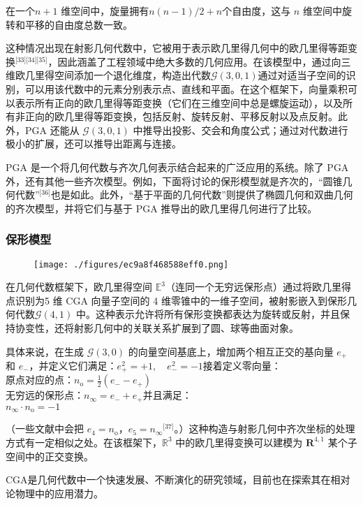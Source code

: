 在一个$n+1$ 维空间中，旋量拥有$n(n-1)/2 + n$个自由度，这与 $n$ 维空间中旋转和平移的自由度总数一致。

这种情况出现在射影几何代数中，它被用于表示欧几里得几何中的欧几里得等距变换\(^\text{[33][34][35]}\)，因此涵盖了工程领域中绝大多数的几何应用。在该模型中，通过向三维欧几里得空间添加一个退化维度，构造出代数$\mathcal{G}(3,0,1)$通过对适当子空间的识别，可以用该代数中的元素分别表示点、直线和平面。在这个框架下，向量乘积可以表示所有正向的欧几里得等距变换（它们在三维空间中总是螺旋运动），以及所有非正向的欧几里得等距变换，包括反射、旋转反射、平移反射以及点反射。此外，PGA 还能从 $\mathcal{G}(3,0,1)$ 中推导出投影、交会和角度公式；通过对代数进行极小的扩展，还可以推导出距离与连接。

PGA 是一个将几何代数与齐次几何表示结合起来的广泛应用的系统。除了 PGA 外，还有其他一些齐次模型。例如，下面将讨论的保形模型就是齐次的，“圆锥几何代数”\(^\text{[36]}\)也是如此。此外，“基于平面的几何代数”则提供了椭圆几何和双曲几何的齐次模型，并将它们与基于 PGA 推导出的欧几里得几何进行了比较。
\subsubsection{保形模型}
\begin{figure}[ht]
\centering
\texttt{[image: ./figures/ec9a8f468588eff0.png]}
\caption{} \label{fig_jiheds_5}
\end{figure}
在几何代数框架下，欧几里得空间 $\mathbb{E}^3$（连同一个无穷远保形点）通过将欧几里得点识别为5 维 CGA 向量子空间的 4 维零锥中的一维子空间，被射影嵌入到保形几何代数$\mathcal{G}(4,1)$ 中。这种表示允许将所有保形变换都表达为旋转或反射，并且保持协变性，还将射影几何中的关联关系扩展到了圆、球等曲面对象。

具体来说，在生成 $\mathcal{G}(3,0)$ 的向量空间基底上，增加两个相互正交的基向量 $e_{+}$ 和 $e_{-}$，并定义它们满足：$e_{+}^2 = +1, \quad e_{-}^2 = -1$接着定义零向量：\\
原点对应的点：$n_{\text{o}} = \frac{1}{2}(e_{-} - e_{+})$\\
无穷远的保形点：$n_{\infty} = e_{-} + e_{+}$并且满足：\\
$n_{\infty} \cdot n_{\text{o}} = -1$

（一些文献中会把 $e_4 = n_{\text{o}}$，$e_5 = n_{\infty}$\(^\text{[37]}\)。）这种构造与射影几何中齐次坐标的处理方式有一定相似之处。在该框架下，$\mathbb{R}^3$ 中的欧几里得变换可以建模为 $\mathbf{R}^{4,1}$ 某个子空间中的正交变换。

CGA是几何代数中一个快速发展、不断演化的研究领域，目前也在探索其在相对论物理中的应用潜力。
